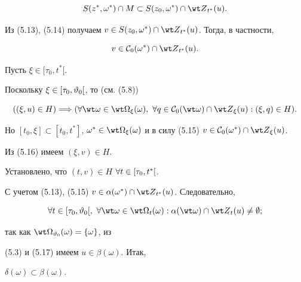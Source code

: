 \begin{pf}
\begin{equation}
S({z^*},{{\omega}^*}) \cap M \subset S({z_0},{{\omega}^*}) \cap


{{\wt Z}_{t^*}}(u).


\end{equation}


Из (5.13), (5.14) получаем $v \in S({z_0},{{\omega}^*}) \cap


{{\wt Z}_{t^*}}(u)$. Тогда, в частности,


\begin{equation}


v \in {{\cal C}_0}({\omega}^*) \cap {{\wt Z}_{t^*}}(u).


\end{equation}


Пусть $\xi \in [{{\tau}_0},{t^*}[$.


Поскольку $\xi \in [{{\tau}_0},{{\vartheta}_0}[$, то (см. (5.8))


\begin{equation}


((\xi,u) \in H) \Lo (\fo{\wt \omega} \in {{\wt \Om}_\xi}(\omega),


\ \fo{q} \in {{\cal C}_0}({\wt \omega}) \cap {{\wt Z}_\xi}(u):


(\xi,q) \in H).


\end{equation}


Но $[{t_0},\xi] \subset [{t_0},{t^*}]$, ${{\omega}^*} \in


{{\wt \Om}_\xi}(\omega)$ и в силу (5.15) $v \in


{{\cal C}_0}({{\omega}^*}) \cap {{\wt Z}_\xi}(u)$.


Из (5.16) имеем $(\xi,v) \in H$.


Установлено, что $(t,v) \in H$ $\forall{t} \in [{{\tau}_0},{t^*}[$.


С учетом (5.13), (5.15) $v \in {{\alpha}({\omega}^*)} \cap


{{\wt Z}_{t^*}}(u)$. Следовательно,


\begin{equation}


\fo{t} \in [{{\tau}_0},{{\vt}_0}[,\ \fo{\wt \omega} \in


{{\wt \Om}_t}(\omega):{{\alpha}({\wt \omega})} \cap


{{\wt Z}_t}(u) \ne \emp;


\end{equation}


так как ${{\wt \Om}_{{\vt}_0}}(\omega) = \{\omega\}$, из


(5.3) и (5.17) имеем $u \in {{\beta}(\omega)}$. Итак,


${{\delta}(\omega)} \subset {{\beta}(\omega)}$.


\end{pf}





